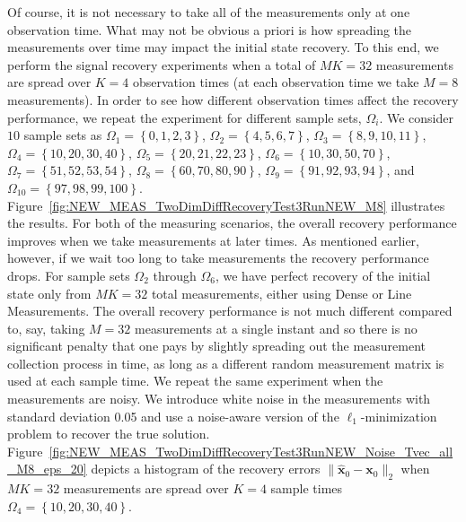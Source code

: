 \documentclass[11pt,draftcls,onecolumn]{IEEEtran}
\newcommand{\vc}[1]{\boldsymbol{#1}}
\begin{document}
Of course, it is not necessary to take all of the measurements only at one observation time. What may not be obvious a priori is how spreading the measurements over time may impact the initial state recovery. To this end, we perform the signal recovery experiments when a total of $MK = 32$ measurements are spread over $K=4$ observation times (at each observation time we take $M=8$ measurements). In order to see how different observation times affect the recovery performance, we repeat the experiment for different sample sets, $\Omega_i$. We consider $10$ sample sets as $\Omega_1 = \left\{0,1,2,3\right\}$, $\Omega_2 = \left\{4,5,6,7\right\}$, $\Omega_3 = \left\{8,9,10,11\right\}$, $\Omega_4 = \left\{10,20,30,40\right\}$, $\Omega_5 = \left\{20,21,22,23\right\}$, $\Omega_6 = \left\{10,30,50,70\right\}$, $\Omega_7 = \left\{51,52,53,54\right\}$, $\Omega_{8} = \left\{60,70,80,90\right\}$, $\Omega_9 = \left\{91,92,93,94\right\}$, and $\Omega_{10} = \left\{97,98,99,100\right\}$.
Figure~\ref{fig:NEW_MEAS_TwoDimDiffRecoveryTest3RunNEW_M8} illustrates the results. For both of the measuring scenarios, the overall recovery performance improves when we take measurements at later times. As mentioned earlier, however, if we wait too long to take measurements the recovery performance drops.
For sample sets $\Omega_2$ through $\Omega_6$, we have perfect recovery of the initial state only from $MK = 32$ total measurements, either using Dense or Line Measurements. The overall recovery performance is not much different compared to, say, taking $M=32$ measurements at a single instant and so there is no significant penalty that one pays by slightly spreading out the measurement collection process in time, as long as a different random measurement matrix is used at each sample time. We repeat the same experiment when the measurements are noisy. We introduce white noise in the measurements with standard deviation 0.05 and use a noise-aware version of the $\ell_1$-minimization problem to recover the true solution.
Figure~\ref{fig:NEW_MEAS_TwoDimDiffRecoveryTest3RunNEW_Noise_Tvec_all_M8_eps_20} depicts a histogram of the recovery errors $\| \widehat{\vc{x}}_0 - \vc{x}_0\|_2$ when $MK = 32$ measurements are spread over $K = 4$ sample times $\Omega_4 = \left\{10,20,30,40\right\}$.
\end{document}
